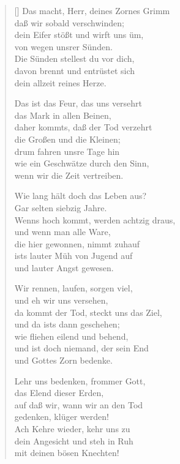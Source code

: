 \begin{multicols}{2}
\begin{verse}[\versewidth]
 Das macht, Herr, deines Zornes Grimm\\
daß wir sobald verschwinden;\\
dein Eifer stößt und wirft uns üm,\\
von wegen unsrer Sünden.\\
Die Sünden stellest du vor dich,\\
davon brennt und entrüstet sich\\
dein allzeit reines Herze.

 Das ist das Feur, das uns versehrt\\
das Mark in allen Beinen,\\
daher kommts, daß der Tod verzehrt\\
die Großen und die Kleinen;\\
drum fahren unsre Tage hin\\
wie ein Geschwätze durch den Sinn,\\
wenn wir die Zeit vertreiben.

 Wie lang hält doch das Leben aus?\\
Gar selten siebzig Jahre.\\
Wenns hoch kommt, werden achtzig draus,\\
und wenn man alle Ware,\\
die hier gewonnen, nimmt zuhauf\\
ists lauter Müh von Jugend auf\\
und lauter Angst gewesen.

 Wir rennen, laufen, sorgen viel,\\
und eh wir uns versehen,\\
da kommt der Tod, steckt uns das Ziel,\\
und da ists dann geschehen;\\
wie fliehen eilend und behend,\\
und ist doch niemand, der sein End\\
und Gottes Zorn bedenke.

 Lehr uns bedenken, frommer Gott,\\
das Elend dieser Erden,\\
auf daß wir, wann wir an den Tod\\
gedenken, klüger werden!\\
Ach Kehre wieder, kehr uns zu\\
dein Angesicht und steh in Ruh\\
mit deinen bösen Knechten!


\end{verse}
\end{multicols}
